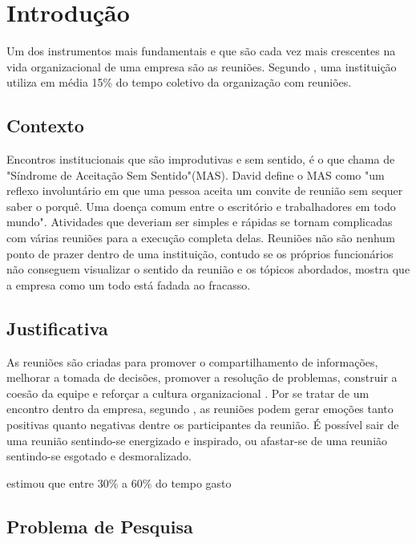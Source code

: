 \chapter[Introdução]{Introdução}
\label{cp:introducao}

Um dos instrumentos mais fundamentais e que são cada vez mais crescentes na vida organizacional de uma empresa são as reuniões. Segundo \cite{allen2016}, uma instituição utiliza em média 15\% do tempo coletivo da organização com reuniões.

\section{Contexto}
\label{sec:contexto}

Encontros institucionais que são improdutivas e sem sentido, é o que \cite{davidgrady} chama de "Síndrome de Aceitação Sem Sentido"(MAS). David define o MAS como "um reflexo involuntário em que uma pessoa aceita um convite de reunião sem sequer saber o porquê. Uma doença comum entre o escritório e trabalhadores em todo mundo". Atividades que deveriam ser simples e rápidas se tornam complicadas com várias reuniões para a execução completa delas. Reuniões não são nenhum ponto de prazer dentro de uma instituição, contudo se os próprios funcionários não conseguem visualizar o sentido da reunião e os tópicos abordados, mostra que a empresa como um todo está fadada ao fracasso.

\section{Justificativa}
\label{sec:justificativa}

As reuniões são criadas para promover o compartilhamento de informações, melhorar a tomada de decisões, promover a resolução de problemas, construir a coesão da equipe e reforçar a cultura organizacional \cite{leach}. Por se tratar de um encontro dentro da empresa, segundo \cite{leach}, as reuniões podem gerar emoções tanto positivas quanto negativas dentre os participantes da reunião. É possível sair de uma reunião sentindo-se energizado e inspirado, ou afastar-se de uma reunião sentindo-se esgotado e desmoralizado.  

\cite{macleod} estimou que entre 30\% a 60\% do tempo gasto

\section{Problema de Pesquisa}
\label{sec:problema_de_pesquisa}

